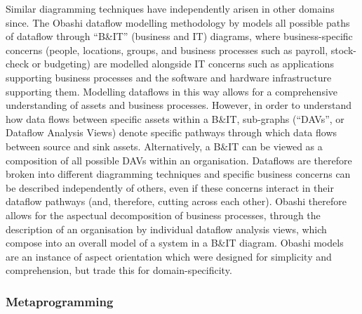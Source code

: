 Similar diagramming techniques have independently arisen in other domains since.
The Obashi dataflow modelling methodology\cite{obashimethodology} by
\citeauthor{obashimethodology} models all possible paths of dataflow through
``B\&IT'' (business and IT) diagrams, where business-specific concerns (people,
locations, groups, and business processes such as payroll, stock-check or
budgeting) are modelled alongside IT concerns such as applications supporting
business processes and the software and hardware infrastructure supporting them.
Modelling dataflows in this way allows for a comprehensive understanding of
assets and business processes. However, in order to understand how data flows
between specific assets within a B\&IT, sub-graphs (``DAVs'', or Dataflow
Analysis Views) denote specific pathways through which data flows between source
and sink assets. Alternatively, a B\&IT can be viewed as a composition of all
possible DAVs within an organisation. Dataflows are therefore broken into
different diagramming techniques and specific business concerns can be described
independently of others, even if these concerns interact in their dataflow
pathways (and, therefore, cutting across each other). Obashi therefore allows
for the aspectual decomposition of business processes, through the description
of an organisation by individual dataflow analysis views, which compose into an
overall model of a system in a B\&IT diagram. Obashi models are an instance of
aspect orientation which were designed for simplicity and
comprehension\cite{obashimethodology,seow2011obashi}, but trade this for
domain-specificity.



\subsubsection{Metaprogramming}\label{metaprogramming_as_an_aop_alternative}


